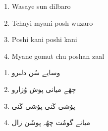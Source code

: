 \documentclass[12pt]{article}
\newcommand{\bigroman}[1]{\fontsize{16pt}{18pt}\selectfont\RaggedRight #1}
\newcommand{\bigarabic}[1]{\fontsize{16pt}{18pt}\selectfont \textarabic{#1}}
\begin{document}
\begin{multicols}{2}
\begin{enumerate}[leftmargin=*, label=\arabic*., font=\fontsize{16pt}{18pt}\selectfont]
  \item \bigroman{Wasaye sun dilbaro}
  \item \bigroman{Tchayi myani posh wuzaro}
  \item \bigroman{Poshi kani poshi kani}
  \item \bigroman{Myane gomut chu poshan zaal}
\end{enumerate}

\columnbreak

\begin{RTL}
\begin{enumerate}[leftmargin=*, label=\arabic*., font=\fontsize{16pt}{18pt}\selectfont]
  \item \bigarabic{وسایے سُن دلبرو}
  \item \bigarabic{چھٔےِ میانی پوش وُزارو}
  \item \bigarabic{پۆشی کَنی پۆشی کَنی}
  \item \bigarabic{میانے گومُت چھُہ پوشَن زال}
\end{enumerate}
\end{RTL}
\end{multicols}
\end{document}
